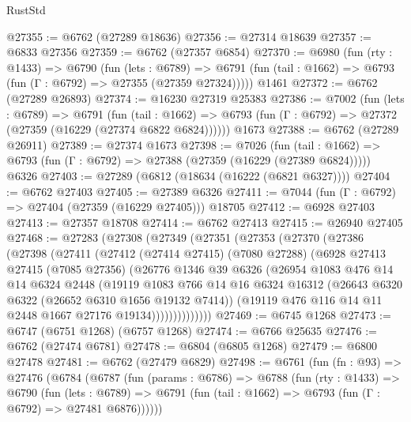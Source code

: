 \begin{lexlean}{RustStd}
\begin{coremodule}
@27355 := @6762 (@27289 @18636)
@27356 := @27314 @18639
@27357 := @6833 @27356
@27359 := @6762 (@27357 @6854)
@27370 := @6980
    (fun (rty : @1433) =>
    @6790
      (fun (lets : @6789) =>
      @6791 (fun (tail : @1662) => @6793 (fun (Γ : @6792) => @27355 (@27359 @27324)))))
    @1461
@27372 := @6762 (@27289 @26893)
@27374 := @16230 @27319 @25383
@27386 := @7002
    (fun (lets : @6789) =>
    @6791
      (fun (tail : @1662) =>
      @6793 (fun (Γ : @6792) => @27372 (@27359 (@16229 (@27374 @6822 @6824))))))
    @1673
@27388 := @6762 (@27289 @26911)
@27389 := @27374 @1673
@27398 := @7026
    (fun (tail : @1662) => @6793 (fun (Γ : @6792) => @27388 (@27359 (@16229 (@27389 @6824)))))
    @6326
@27403 := @27289 (@6812 (@18634 (@16222 (@6821 @6327))))
@27404 := @6762 @27403
@27405 := @27389 @6326
@27411 := @7044 (fun (Γ : @6792) => @27404 (@27359 (@16229 @27405))) @18705
@27412 := @6928 @27403
@27413 := @27357 @18708
@27414 := @6762 @27413
@27415 := @26940 @27405
@27468 := @27283
    (@27308
      (@27349
        (@27351
          (@27353
            (@27370
              (@27386
                (@27398
                  (@27411
                    (@27412
                      (@27414 @27415)
                      (@7080 @27288)
                      (@6928
                        @27413
                        @27415
                        (@7085 @27356)
                        (@26776
                          @1346
                          @39
                          @6326
                          (@26954
                            @1083
                            @476
                            @14
                            @14
                            @6324
                            @2448
                            (@19119
                              @1083
                              @766
                              @14
                              @16
                              @6324
                              @16312
                              (@26643 @6320 @6322 (@26652 @6310 @1656 @19132 @7414))
                              (@19119 @476 @116 @14 @11 @2448 @1667 @27176 @19134))))))))))))))
@27469 := @6745 @1268
@27473 := @6747 (@6751 @1268) (@6757 @1268)
@27474 := @6766 @25635
@27476 := @6762 (@27474 @6781)
@27478 := @6804 (@6805 @1268)
@27479 := @6800 @27478
@27481 := @6762 (@27479 @6829)
@27498 := @6761
    (fun (fn : @93) =>
    @27476
      (@6784
        (@6787
          (fun (params : @6786) =>
          @6788
            (fun (rty : @1433) =>
            @6790
              (fun (lets : @6789) =>
              @6791 (fun (tail : @1662) => @6793 (fun (Γ : @6792) => @27481 @6876))))))

\end{coremodule}
\end{lexlean}
